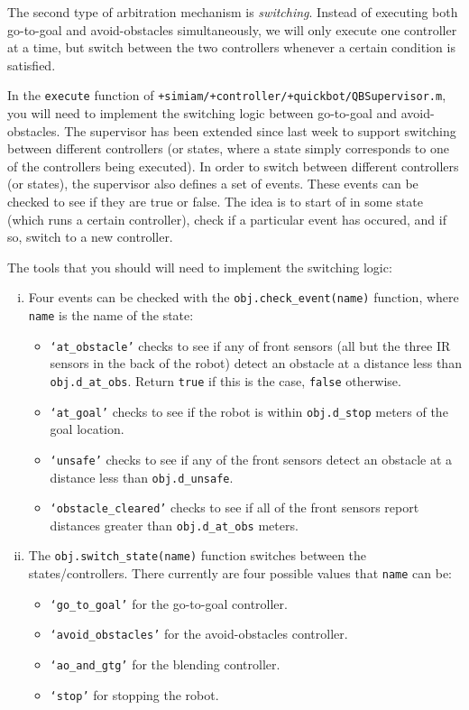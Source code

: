 \documentclass[10pt]{article}
\begin{document}
\begin{enumerate}
  The second type of arbitration mechanism is \textit{switching}. Instead of executing both go-to-goal and avoid-obstacles simultaneously, we will only execute one controller at a time, but switch between the two controllers whenever a certain condition is satisfied.
  
  In the \texttt{execute} function of \texttt{+simiam/+controller/+quickbot/QBSupervisor.m}, you will need to implement the switching logic between go-to-goal and avoid-obstacles. The supervisor has been extended since last week to support switching between different controllers (or states, where a state simply corresponds to one of the controllers being executed). In order to switch between different controllers (or states), the supervisor also defines a set of events. These events can be checked to see if they are true or false. The idea is to start of in some state (which runs a certain controller), check if a particular event has occured, and if so, switch to a new controller.
  
  The tools that you should will need to implement the switching logic:
  \begin{enumerate}[(i)]
    \item Four events can be checked with the \texttt{obj.check\_event(name)} function, where \texttt{name} is the name of the state:
      \begin{itemize}
        \item \texttt{`at\_obstacle'} checks to see if any of front sensors (all but the three IR sensors in the back of the robot) detect an obstacle at a distance less than \texttt{obj.d\_at\_obs}. Return \texttt{true} if this is the case, \texttt{false} otherwise.
        \item \texttt{`at\_goal'} checks to see if the robot is within \texttt{obj.d\_stop} meters of the goal location.
        \item \texttt{`unsafe'} checks to see if any of the front sensors detect an obstacle at a distance less than \texttt{obj.d\_unsafe}.
        \item \texttt{`obstacle\_cleared'} checks to see if all of the front sensors report distances greater than \texttt{obj.d\_at\_obs} meters.
      \end{itemize}
    \item The \texttt{obj.switch\_state(name)} function switches between the states/controllers. There currently are four possible values that \texttt{name} can be:
      \begin{itemize}
        \item \texttt{`go\_to\_goal'} for the go-to-goal controller.
        \item \texttt{`avoid\_obstacles'} for the avoid-obstacles controller.
        \item \texttt{`ao\_and\_gtg'} for the blending controller.
        \item \texttt{`stop'} for stopping the robot.
      \end{itemize}
  \end{enumerate}
  

\end{enumerate}
\end{document}
